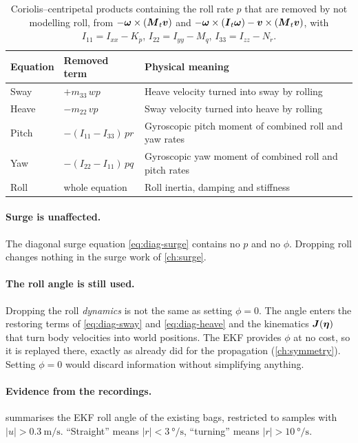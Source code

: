 \begin{table}[htbp]
\centering
\caption{Coriolis--centripetal products containing the roll rate $p$ that are removed by not
modelling roll, from $-\boldsymbol{\omega}\times(\boldsymbol{M}_t\boldsymbol{v})$ and
$-\boldsymbol{\omega}\times(\boldsymbol{I}_t\boldsymbol{\omega}) - \boldsymbol{v}\times(\boldsymbol{M}_t\boldsymbol{v})$, with
$I_{11} = I_{xx} - K_{\dot p}$, $I_{22} = I_{yy} - M_{\dot q}$, $I_{33} = I_{zz} - N_{\dot r}$.}
\label{tab:roll-terms}
\small
\begin{tabular}{@{}lll@{}}
\toprule
Equation & Removed term & Physical meaning \\
\midrule
Sway  & $+m_{33}\,w p$ & Heave velocity turned into sway by rolling \\
Heave & $-m_{22}\,v p$ & Sway velocity turned into heave by rolling \\
Pitch & $-(I_{11} - I_{33})\,p r$ & Gyroscopic pitch moment of combined roll and yaw rates \\
Yaw   & $-(I_{22} - I_{11})\,p q$ & Gyroscopic yaw moment of combined roll and pitch rates \\
Roll  & whole equation & Roll inertia, damping and stiffness \\
\bottomrule
\end{tabular}
\end{table}
\FloatBarrier

\paragraph{Surge is unaffected.} The diagonal surge equation \eqref{eq:diag-surge} contains no
$p$ and no $\phi$. Dropping roll changes nothing in the surge work of \cref{ch:surge}.

\paragraph{The roll angle is still used.} Dropping the roll \emph{dynamics} is not the same as
setting $\phi = 0$. The angle enters the restoring terms of \eqref{eq:diag-sway} and
\eqref{eq:diag-heave} and the kinematics $\boldsymbol{J}(\boldsymbol{\eta})$ that turn body velocities into
world positions. The EKF provides $\phi$ at no cost, so it is replayed there, exactly as
 already did for the propagation (\cref{ch:symmetry}). Setting
$\phi = 0$ would discard information without simplifying anything.

\paragraph{Evidence from the recordings.}  summarises the EKF roll angle
of the existing bags, restricted to samples with $|u| > \qty{0.3}{\meter\per\second}$.
``Straight'' means $|r| < \qty{3}{\degree\per\second}$, ``turning'' means
$|r| > \qty{10}{\degree\per\second}$.

